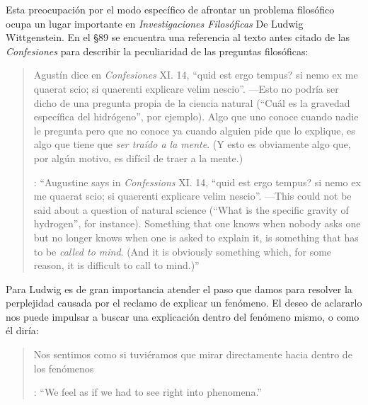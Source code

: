 Esta preocupación por el modo específico de afrontar un problema filosófico ocupa un lugar importante en \emph{Investigaciones Filosóficas} De Ludwig Wittgenstein. En el \S89 se encuentra una referencia al texto antes citado de las \emph{Confesiones} para describir la peculiaridad de las preguntas filosóficas: \blockquote[{\cite[\S89]{wittgenstein1953phiinv}}: \enquote{Augustine says in \emph{Confessions} XI. 14, ``quid est ergo tempus? si nemo ex me quaerat scio; si quaerenti explicare velim nescio''. ---This could not be said about a question of natural science (``What is the specific gravity of hydrogen'', for instance). Something that one knows when nobody asks one but no longer knows when one is asked to explain it, is something that has to be \emph{called to mind}. (And it is obviously something which, for some reason, it is difficult to call to mind.)}]{Agustín dice en \emph{Confesiones} XI. 14, ``quid est ergo tempus? si nemo ex me quaerat scio; si quaerenti explicare velim nescio''. ---Esto no podría ser dicho de una pregunta propia de la ciencia natural (``Cuál es la gravedad específica del hidrógeno'', por ejemplo). Algo que uno conoce cuando nadie le pregunta pero que no conoce ya cuando alguien pide que lo explique, es algo que tiene que \emph{ser traído a la mente}. (Y esto es obviamente algo que, por algún motivo, es difícil de traer a la mente.)} Para Ludwig es de gran importancia atender el paso que damos para resolver la perplejidad causada por el reclamo de explicar un fenómeno. El deseo de aclararlo nos puede impulsar a buscar una explicación dentro del fenómeno mismo, o como él diría: \blockquote[{\cite[\S90]{wittgenstein1953phiinv}}: \enquote{We feel as if we had to see right into phenomena.}]{Nos sentimos como si tuviéramos que mirar directamente hacia dentro de los fenómenos}.


